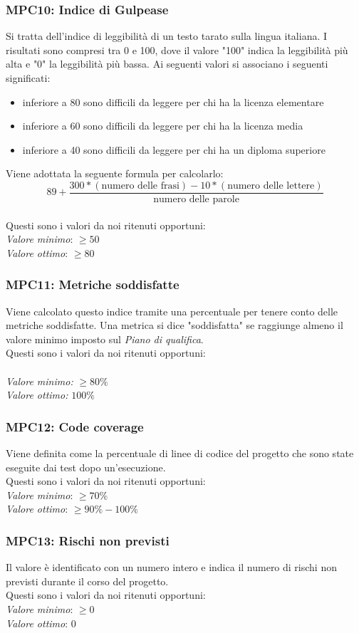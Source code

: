 \subsubsection{MPC10: Indice di Gulpease}
Si tratta dell'indice di leggibilità di un testo tarato sulla lingua italiana.
I risultati sono compresi tra 0 e 100, dove il valore "100" indica la leggibilità più alta e "0" la leggibilità più bassa. Ai seguenti valori si associano i seguenti significati:
\begin{itemize}
\item inferiore a 80 sono difficili da leggere per chi ha la licenza elementare
\item inferiore a 60 sono difficili da leggere per chi ha la licenza media
\item inferiore a 40 sono difficili da leggere per chi ha un diploma superiore
\end{itemize}
Viene adottata la seguente formula per calcolarlo:
\begin{equation*}
89+\frac{300*(\text{numero delle frasi})-10*(\text{numero delle lettere})}{\text{numero delle parole}}
\end{equation*}\\
Questi sono i valori da noi ritenuti opportuni:\\
\textit{Valore minimo}: $ \ge 50 $\\ 
\textit{Valore ottimo}: $ \ge 80 $\\

\subsubsection{MPC11: Metriche soddisfatte}
Viene calcolato questo indice tramite una percentuale per tenere conto delle metriche soddisfatte. Una metrica si dice "soddisfatta" se raggiunge almeno il valore minimo imposto sul \textit{Piano di qualifica}.\\
Questi sono i valori da noi ritenuti opportuni:\\\\
\textit{Valore minimo:} $ \ge 80\% $\\
\textit{Valore ottimo:} $ 100\% $\\

\subsubsection{MPC12: Code coverage}
Viene definita come la percentuale di linee di codice del progetto che sono state eseguite dai test dopo un'esecuzione.\\
Questi sono i valori da noi ritenuti opportuni:\\
\textit{Valore minimo}: $ \ge 70\% $\\
\textit{Valore ottimo}: $ \ge 90\% - 100\% $\\

\subsubsection{MPC13: Rischi non previsti}
Il valore è identificato con un numero intero e indica il numero di rischi non previsti durante il corso del progetto.\\
Questi sono i valori da noi ritenuti opportuni:\\
\textit{Valore minimo}: $ \ge 0$\\
\textit{Valore ottimo}: 0\\